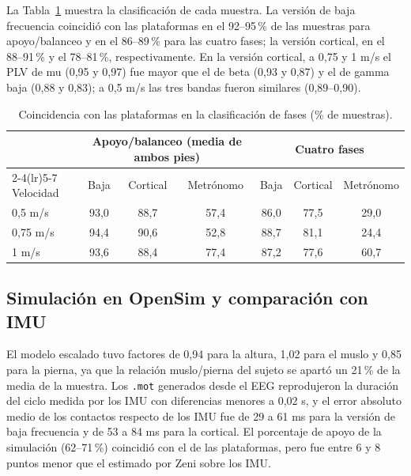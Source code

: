 \documentclass[10pt]{article}
\begin{document}
La Tabla~\ref{tab:clasif} muestra la clasificación de cada muestra. La versión de baja frecuencia coincidió con las plataformas en el 92--95\,\% de las muestras para apoyo/balanceo y en el 86--89\,\% para las cuatro fases; la versión cortical, en el 88--91\,\% y el 78--81\,\%, respectivamente. En la versión cortical, a 0,75 y 1 m/s el PLV de mu (0,95 y 0,97) fue mayor que el de beta (0,93 y 0,87) y el de gamma baja (0,88 y 0,83); a 0,5 m/s las tres bandas fueron similares (0,89--0,90).

\begin{table}[H]
\centering
\small
\begin{tabular}{lcccccc}
\toprule
 & \multicolumn{3}{c}{Apoyo/balanceo (media de ambos pies)} & \multicolumn{3}{c}{Cuatro fases} \\
\cmidrule(lr){2-4}\cmidrule(lr){5-7}
Velocidad & Baja & Cortical & Metrónomo & Baja & Cortical & Metrónomo \\
\midrule
0,5 m/s  & 93,0 & 88,7 & 57,4 & 86,0 & 77,5 & 29,0 \\
0,75 m/s & 94,4 & 90,6 & 52,8 & 88,7 & 81,1 & 24,4 \\
1 m/s    & 93,6 & 88,4 & 77,4 & 87,2 & 77,6 & 60,7 \\
\bottomrule
\end{tabular}
\vspace{1mm}
\caption{Coincidencia con las plataformas en la clasificación de fases (\% de muestras).}
\label{tab:clasif}
\end{table}

\subsection{Simulación en OpenSim y comparación con IMU}

El modelo escalado tuvo factores de 0,94 para la altura, 1,02 para el muslo y 0,85 para la pierna, ya que la relación muslo/pierna del sujeto se apartó un 21\,\% de la media de la muestra. Los \texttt{.mot} generados desde el EEG reprodujeron la duración del ciclo medida por los IMU con diferencias menores a 0,02 s, y el error absoluto medio de los contactos respecto de los IMU fue de 29 a 61 ms para la versión de baja frecuencia y de 53 a 84 ms para la cortical. El porcentaje de apoyo de la simulación (62--71\,\%) coincidió con el de las plataformas, pero fue entre 6 y 8 puntos menor que el estimado por Zeni sobre los IMU.
\end{document}
